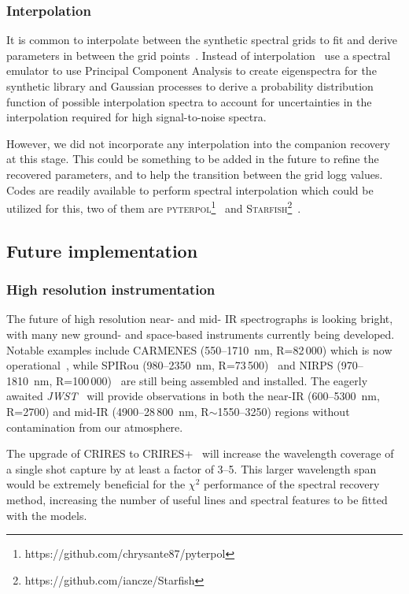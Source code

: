 \documentclass[fleqn,usenatbib]{mnras}
\begin{document}
\subsubsection{Interpolation}
\label{subsubsec:interpolation}
It is common to interpolate between the synthetic spectral grids to fit and derive parameters in between the grid points~\citep[e.g.][]{nemravova_xtauri_2016, passegger_fundamental_2016}. Instead of interpolation~\citet{czekala_constructing_2015} use a spectral emulator to use Principal Component Analysis to create eigenspectra for the synthetic library and Gaussian processes to derive a probability distribution function of possible interpolation spectra to account for uncertainties in the interpolation required for high signal-to-noise spectra.

However, we did not incorporate any interpolation into the companion recovery at this stage. This could be something to be added in the future to refine the recovered parameters, and to help the transition between the grid logg values. Codes are readily available to perform spectral interpolation which could be utilized for this, two of them are \textsc{pyterpol}\footnote{https://github.com/chrysante87/pyterpol}~\citet{nemravova_xtauri_2016} and \textsc{Starfish}\footnote{https://github.com/iancze/Starfish}~\citep{czekala_constructing_2015}.

\subsection{Future implementation}
\label{subsec:future}
\subsubsection{High resolution instrumentation}
\label{subsubsec:highres}
The future of high resolution near- and mid- IR spectrographs is looking bright, with many new ground- and space-based instruments currently being developed. Notable examples include CARMENES (550--1710~nm, R=82\,000) which is now operational~\citep{quirrenbach_carmenes_2014}, while SPIRou (980--2350~nm, R=73\,500)~\citep{artigau_spirou_2014} and NIRPS (970--1810~nm, R=100\,000)~\citep{bouchy_nearinfrared_2017} are still being assembled and installed. The eagerly awaited \textit{JWST}~\citep{gardner_james_2006} will provide observations in both the near-IR (600--5300~nm, R=2700) and mid-IR (4900--28\,800~nm, R$\sim$1550--3250) regions without contamination from our atmosphere.

The upgrade of CRIRES to CRIRES+~\citep{dorn_crires_2016} will increase the wavelength coverage of a single shot capture by at least a factor of 3--5. This larger wavelength span would be extremely beneficial for the \(\chi^2\) performance of the spectral recovery method, increasing the number of useful lines and spectral features to be fitted with the models.
\end{document}
